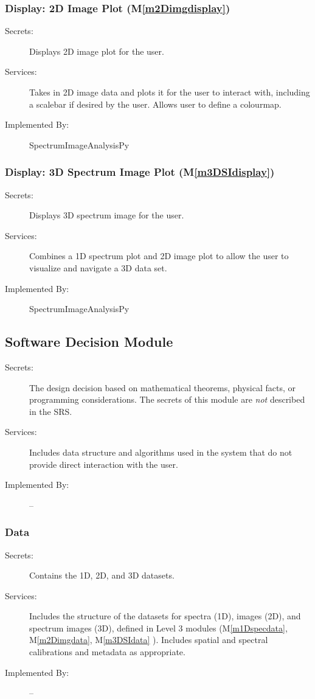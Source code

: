 \documentclass[12pt, titlepage]{article}
\newcommand{\mref}[1]{M\ref{#1}}
\newcommand{\progname}{SpectrumImageAnalysisPy}
\begin{document}
\subsubsection{Display: 2D Image Plot (\mref{m2Dimgdisplay})}
\label{sssec:Plot2D}
\begin{description}
	\item[Secrets:]Displays 2D image plot for the user.
	\item[Services:]Takes in 2D image data and plots it for the user to interact
with, including a scalebar if desired by the user. Allows user to define a
colourmap. 
	\item[Implemented By:] \progname
\end{description}

\subsubsection{Display: 3D Spectrum Image Plot (\mref{m3DSIdisplay})}
\label{sssec:Plot3D}
\begin{description}
	\item[Secrets:]Displays 3D spectrum image for the user.
	\item[Services:]Combines a 1D spectrum plot and 2D image plot to allow the user
to visualize and navigate a 3D data set. 
	\item[Implemented By:] \progname
\end{description}

\subsection{Software Decision Module}

\begin{description}
\item[Secrets:] The design decision based on mathematical theorems, physical
  facts, or programming considerations. The secrets of this module are
  \emph{not} described in the SRS.
\item[Services:] Includes data structure and algorithms used in the system that
  do not provide direct interaction with the user. 
\item[Implemented By:] --
\end{description}

\subsubsection{Data}
\label{sssec:Data}
\begin{description}
	\item[Secrets:]Contains the 1D, 2D, and 3D datasets.
	\item[Services:]Includes the structure of the datasets for spectra (1D), images
(2D), and spectrum images (3D), defined in Level 3 modules (\mref{m1Dspecdata},
\mref{m2Dimgdata}, \mref{m3DSIdata} ). Includes spatial and spectral
calibrations and metadata as appropriate.
	\item[Implemented By:] --
\end{description}
\end{document}
